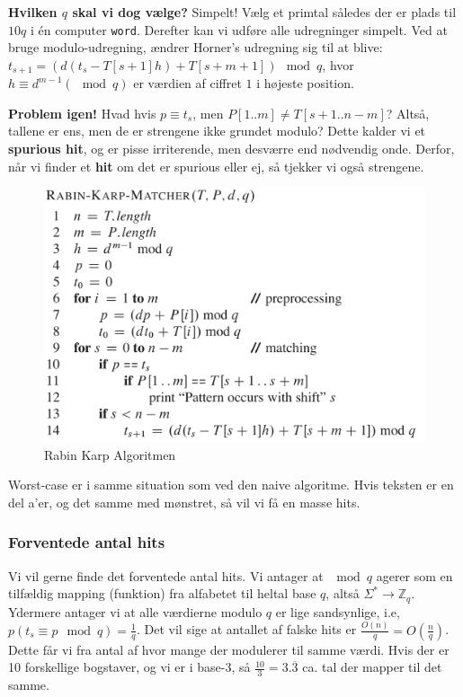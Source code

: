 \documentclass[11pt]{article}
\theoremstyle{definition}
\theoremstyle{remark}
\begin{document}
\textbf{Hvilken $q$ skal vi dog vælge?} Simpelt! Vælg et primtal således der er plads til $10q$  i én computer \texttt{word}. Derefter kan vi udføre alle udregninger simpelt. Ved at bruge modulo-udregning, ændrer Horner's udregning sig til at blive: $t_{s+1} = (d(t_{s} - T[s+1]h) + T[s+m+1]) \mod q$, hvor $h \equiv d^{m-1} (\mod q)$ er værdien af ciffret $1$ i højeste position. 

\textbf{Problem igen!} Hvad hvis $p \equiv t_{s}$, men $P[1..m] \neq T[s+1..n-m]$? Altså, tallene er ens, men de er strengene ikke grundet modulo? Dette kalder vi et \textbf{spurious hit}, og er pisse irriterende, men desværre end nødvendig onde. Derfor, når vi finder et \textbf{hit} om det er spurious eller ej, så tjekker vi også strengene. 

\begin{figure}[ht]
  \centering
  \includegraphics[width=400pt]{main--string-matching--rabin-karp-9fe7.png}
  \caption{\label{fig:rabinkarpalgorithm} Rabin Karp Algoritmen}
\end{figure}


Worst-case er i samme situation som ved den naive algoritme. Hvis teksten er en del a'er, og det samme med mønstret, så vil vi få en masse hits.



\subsubsection{Forventede antal hits}

Vi vil gerne finde det forventede antal hits. Vi antager at $\mod q$ agerer som en tilfældig mapping (funktion) fra alfabetet til heltal base $q$, altså $\Sigma^{*} \rightarrow \mathbb{Z}_{q}$. Ydermere antager vi at alle værdierne modulo $q$ er lige sandsynlige, i.e, $p(t_{s} \equiv p \mod q) = \frac{1}{q}$. Det vil sige at antallet af falske hits er $\frac{O(n)}{q} = O(\frac{n}{q}) $. Dette får vi fra antal af hvor mange der modulerer til samme værdi. Hvis der er 10 forskellige bogstaver, og vi er i base-3, så $\frac{10}{3} = 3.\overline{3}$ ca. tal der mapper til det samme.
\end{document}

